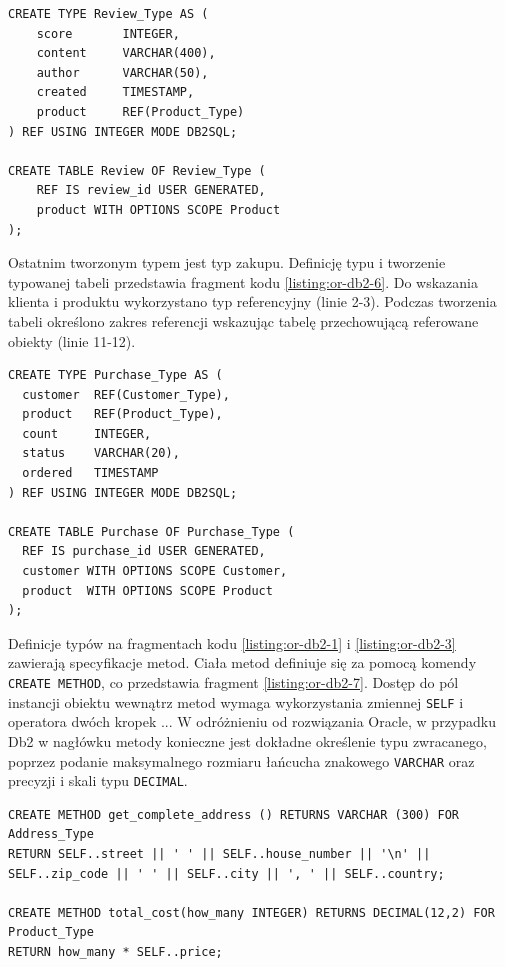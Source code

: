 \documentclass[a4paper,twoside,12pt]{book}
\begin{document}
\begin{lstlisting}[style=SQL, caption={Tworzenie typu i tabeli recenzji w Db2.}, label={listing:or-db2-5}, captionpos=b]
CREATE TYPE Review_Type AS (
	score 		INTEGER,
	content 	VARCHAR(400),
	author		VARCHAR(50),
	created		TIMESTAMP,
	product 	REF(Product_Type)
) REF USING INTEGER MODE DB2SQL;

CREATE TABLE Review OF Review_Type (
	REF IS review_id USER GENERATED,
	product WITH OPTIONS SCOPE Product
);
\end{lstlisting}

Ostatnim tworzonym typem jest typ zakupu. Definicję typu i tworzenie typowanej tabeli przedstawia fragment kodu \ref{listing:or-db2-6}. Do wskazania klienta i produktu wykorzystano typ referencyjny (linie 2-3). Podczas tworzenia tabeli określono zakres referencji wskazując tabelę przechowującą referowane obiekty (linie 11-12).

\begin{lstlisting}[style=SQL, caption={Tworzenie typu i tabeli zakupów w Db2.}, label={listing:or-db2-6}, captionpos=b]
CREATE TYPE Purchase_Type AS (
  customer  REF(Customer_Type),
  product   REF(Product_Type),
  count     INTEGER,
  status    VARCHAR(20),
  ordered   TIMESTAMP
) REF USING INTEGER MODE DB2SQL;

CREATE TABLE Purchase OF Purchase_Type (
  REF IS purchase_id USER GENERATED,
  customer WITH OPTIONS SCOPE Customer,
  product  WITH OPTIONS SCOPE Product
);
\end{lstlisting}

Definicje typów na fragmentach kodu \ref{listing:or-db2-1} i \ref{listing:or-db2-3} zawierają specyfikacje metod. Ciała metod definiuje się za pomocą komendy \lstinline{CREATE METHOD}, co przedstawia fragment \ref{listing:or-db2-7}. Dostęp do pól instancji obiektu wewnątrz metod wymaga wykorzystania zmiennej \lstinline{SELF} i operatora dwóch kropek \textquotedbl..\textquotedbl. W odróżnieniu od rozwiązania Oracle, w przypadku Db2 w nagłówku metody konieczne jest dokładne określenie typu zwracanego, poprzez podanie maksymalnego rozmiaru łańcucha znakowego \lstinline{VARCHAR} oraz precyzji i skali typu \lstinline{DECIMAL}.

\begin{lstlisting}[style=SQL, caption={Tworzenie ciał metod w Db2.}, label={listing:or-db2-7}, captionpos=b]
CREATE METHOD get_complete_address () RETURNS VARCHAR (300) FOR Address_Type
RETURN SELF..street || ' ' || SELF..house_number || '\n' || SELF..zip_code || ' ' || SELF..city || ', ' || SELF..country;

CREATE METHOD total_cost(how_many INTEGER) RETURNS DECIMAL(12,2) FOR Product_Type
RETURN how_many * SELF..price;
\end{lstlisting}
\end{document}
